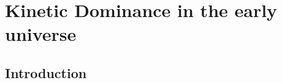 \chapter{Kinetic Dominance in the early universe}
\label{chap:kd}

\section{Introduction}
\label{sec:kd:intro}
